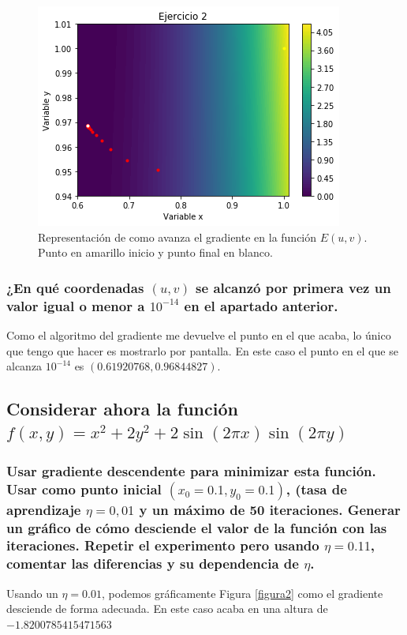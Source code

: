 \documentclass[12pt,a4paper]{article}
\begin{document}
\begin{figure}[H]  %
\centering
\includegraphics{images/primerDescensoGradiente.png}  %
\caption{Representación de como avanza el gradiente en la función \(E(u,v)\). Punto en amarillo inicio y punto final en blanco.}
\label{figura1}
\end{figure}

\subsubsection{¿En qué coordenadas \((u, v)\) se alcanzó por primera vez un valor igual o menor a \(10^{-14}\) en el apartado anterior.}
Como el algoritmo del gradiente me devuelve el punto en el que acaba, lo único que tengo que hacer es mostrarlo por pantalla. En este caso el punto en el que se alcanza \(10^{-14}\) es \textbf{\((0.61920768,0.96844827)\)}.

\subsection{Considerar ahora la función \(  f(x,y)=x^2+2y^2+2\sin(2\pi x)\sin(2\pi y)\)}
\subsubsection{Usar gradiente descendente para minimizar esta función. Usar como punto inicial \((x_{0}=0.1, y_{0}=0.1)\), (tasa de aprendizaje \(\eta=0,01\) y un máximo de 50 iteraciones. Generar un gráfico de cómo desciende el valor de la función con las iteraciones. Repetir el experimento pero usando \(\eta=0.11\), comentar las diferencias y su dependencia de \(\eta\).}
Usando un \(\eta=0.01\), podemos gráficamente Figura  \ref{figura2} como el gradiente desciende de forma adecuada. En este caso acaba en una altura de \(-1.8200785415471563\)
\end{document}
